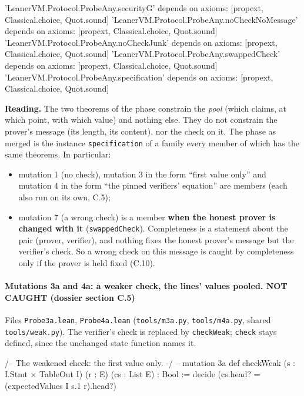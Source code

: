 \begin{srccode}
'LeanerVM.Protocol.ProbeAny.securityG' depends on axioms: [propext, Classical.choice, Quot.sound]
'LeanerVM.Protocol.ProbeAny.noCheckNoMessage' depends on axioms: [propext, Classical.choice, Quot.sound]
'LeanerVM.Protocol.ProbeAny.noCheckJunk' depends on axioms: [propext, Classical.choice, Quot.sound]
'LeanerVM.Protocol.ProbeAny.swappedCheck' depends on axioms: [propext, Classical.choice, Quot.sound]
'LeanerVM.Protocol.ProbeAny.specification' depends on axioms: [propext, Classical.choice, Quot.sound]
\end{srccode}

\textbf{Reading.} The two theorems of the phase constrain the \emph{pool} (which claims, at which point, with which value) and nothing else. They do not constrain the prover's message (its length, its content), nor the check on it. The phase as merged is the instance \texttt{specification} of a family every member of which has the same theorems. In particular:

\begin{itemize}
\item mutation 1 (no check), mutation 3 in the form \enquote{first value only} and mutation 4 in the form \enquote{the pinned verifiers' equation} are members (each also run on its own, C.5);
\item mutation 7 (a wrong check) is a member \textbf{when the honest prover is changed with it} (\texttt{swappedCheck}). Completeness is a statement about the pair (prover, verifier), and nothing fixes the honest prover's message but the verifier's check. So a wrong check on this message is caught by completeness only if the prover is held fixed (C.10).
\end{itemize}

\paragraph{Mutations 3a and 4a: a weaker check, the lines' values pooled. NOT CAUGHT (dossier section C.5)}\label{sec:gen-pubinput-C5}

Files \texttt{Probe3a.\allowbreak{}lean}, \texttt{Probe4a.\allowbreak{}lean} (\texttt{tools/\allowbreak{}m3a.\allowbreak{}py}, \texttt{tools/\allowbreak{}m4a.\allowbreak{}py}, shared \texttt{tools/\allowbreak{}weak.\allowbreak{}py}). The verifier's check is replaced by \texttt{checkWeak}; \texttt{check} stays defined, since the unchanged state function names it.

\begin{leancode}
/-- The weakened check: the first value only. -/                       -- mutation 3a
def checkWeak (s : I.Stmt × TableOut I) (r : E) (cs : List E) : Bool :=
  decide (cs.head? = (expectedValues I s.1 r).head?)
\end{leancode}

